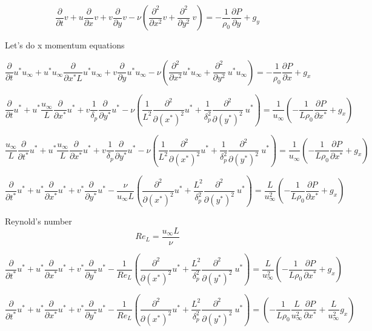\documentclass[11pt]{article}
\begin{document}
$$\frac{\partial }{\partial t} v + u \frac{\partial}{\partial x} v + v \frac{\partial}{\partial y} v - \nu ( \frac{\partial^2}{\partial x^2} v + \frac{\partial^2}{\partial y^2} \ v ) = - \frac{1}{\rho_0} \frac{\partial P}{\partial y} +g_y$$

Let's do x momentum equations

$$\frac{\partial }{\partial t} u^* u_\infty + u^* u_\infty \frac{\partial}{\partial x^* L} u^* u_\infty + v \frac{\partial}{\partial y} u^* u_\infty - \nu ( \frac{\partial^2}{\partial x^2} u^* u_\infty + \frac{\partial^2}{\partial y^2} \ u^* u_\infty ) = - \frac{1}{\rho_0} \frac{\partial P}{\partial x} +g_x$$


$$\frac{\partial }{\partial t} u^* + u^* \frac{u_\infty}{L} \frac{\partial}{\partial x^* } u^* + v \frac{1}{\delta_p} \frac{\partial}{\partial y^*} u^* - \nu (\frac{1}{L^2} \frac{\partial^2}{\partial (x^*)^2} u^* + \frac{1}{\delta_p^2} \frac{\partial^2}{\partial (y^*)^2} \ u^* ) = \frac{1}{u_\infty} ( - \frac{1}{L \rho_0} \frac{\partial P}{\partial x^*} +g_x)$$

$$\frac{u_\infty}{L}\frac{\partial }{\partial t^*} u^* + u^* \frac{u_\infty}{L} \frac{\partial}{\partial x^* } u^* + v \frac{1}{\delta_p} \frac{\partial}{\partial y^*} u^* - \nu (\frac{1}{L^2} \frac{\partial^2}{\partial (x^*)^2} u^* + \frac{1}{\delta_p^2} \frac{\partial^2}{\partial (y^*)^2} \ u^* ) = \frac{1}{u_\infty} ( - \frac{1}{L \rho_0} \frac{\partial P}{\partial x^*} +g_x)$$


$$\frac{\partial }{\partial t^*} u^* + u^*  \frac{\partial}{\partial x^* } u^* + v^*  \frac{\partial}{\partial y^*} u^* - \frac{\nu}{u_\infty L}  ( \frac{\partial^2}{\partial (x^*)^2} u^* + \frac{L^2}{\delta_p^2} \frac{\partial^2}{\partial (y^*)^2} \ u^* ) = \frac{L}{u_\infty^2} ( - \frac{1}{L \rho_0} \frac{\partial P}{\partial x^*} +g_x)$$

Reynold's number
$$Re_L  = \frac{u_\infty L}{\nu}$$

$$\frac{\partial }{\partial t^*} u^* + u^*  \frac{\partial}{\partial x^* } u^* + v^*  \frac{\partial}{\partial y^*} u^* - \frac{1}{Re_L}  ( \frac{\partial^2}{\partial (x^*)^2} u^* + \frac{L^2}{\delta_p^2} \frac{\partial^2}{\partial (y^*)^2} \ u^* ) = \frac{L}{u_\infty^2} ( - \frac{1}{L \rho_0} \frac{\partial P}{\partial x^*} +g_x)$$

$$\frac{\partial }{\partial t^*} u^* + u^*  \frac{\partial}{\partial x^* } u^* + v^*  \frac{\partial}{\partial y^*} u^* - \frac{1}{Re_L}  ( \frac{\partial^2}{\partial (x^*)^2} u^* + \frac{L^2}{\delta_p^2} \frac{\partial^2}{\partial (y^*)^2} \ u^* ) =  ( - \frac{1}{L \rho_0}  \frac{L}{u_\infty^2} \frac{\partial P}{\partial x^*} + \frac{L}{u_\infty^2}g_x)$$
\end{document}
